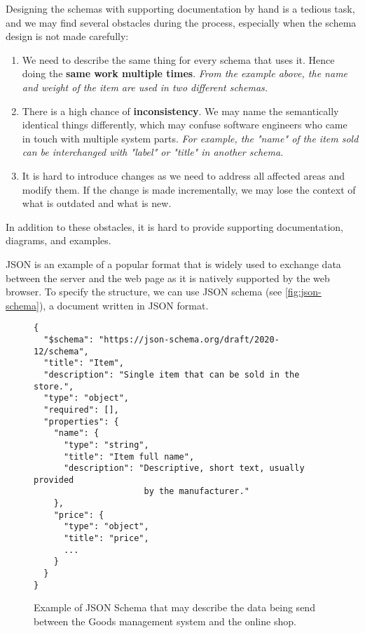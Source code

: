 Designing the schemas with supporting documentation by hand is a tedious task, and we may find several obstacles during the process, especially when the schema design is not made carefully:

\begin{enumerate}
    \item We need to describe the same thing for every schema that uses it. Hence doing the \textbf{same work multiple times}. \textit{From the example above, the name and weight of the item are used in two different schemas.}
    \item There is a high chance of \textbf{inconsistency}. We may name the semantically identical things differently, which may confuse software engineers who came in touch with multiple system parts. \textit{For example, the "name" of the item sold can be interchanged with "label" or "title" in another schema.}
    \item It is hard to introduce changes as we need to address all affected areas and modify them. If the change is made incrementally, we may lose the context of what is outdated and what is new.
\end{enumerate}

In addition to these obstacles, it is hard to provide supporting documentation, diagrams, and examples.

\bigskip

JSON is an example of a popular format that is widely used to exchange data between the server and the web page as it is natively supported by the web browser. To specify the structure, we can use JSON schema (see \autoref{fig:json-schema}), a document written in JSON format.

\begin{figure}[h]
\begin{verbatim}
{
  "$schema": "https://json-schema.org/draft/2020-12/schema",
  "title": "Item",
  "description": "Single item that can be sold in the store.",
  "type": "object",
  "required": [],
  "properties": {
    "name": {
      "type": "string",
      "title": "Item full name",
      "description": "Descriptive, short text, usually provided
                      by the manufacturer."
    },
    "price": {
      "type": "object",
      "title": "price",
      ...
    }
  }
}
\end{verbatim}
\caption{Example of JSON Schema that may describe the data being send between the Goods management system and the online shop.}
\label{fig:json-schema}
\end{figure}

